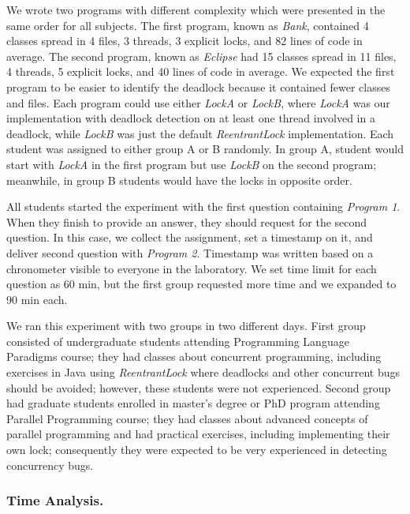 We wrote two programs with different complexity which were presented in the same order for all subjects. The first program, known as \emph{Bank}, contained 4 classes spread in 4 files, 3 threads, 3 explicit locks, and 82 lines of code in average. The second program, known as \emph{Eclipse} had 15 classes spread in 11 files, 4 threads, 5 explicit locks, and 40 lines of code in average. We expected the first program to be easier to identify the deadlock because it contained fewer classes and files. Each program could use either \emph{LockA} or \emph{LockB}, where \emph{LockA} was our implementation with deadlock detection on at least one thread involved in a deadlock, while \emph{LockB} was just the default \emph{ReentrantLock} implementation. Each student was assigned to either group A or B randomly. In group A, student would start with \emph{LockA} in the first program but use \emph{LockB} on the second program; meanwhile, in group B students would have the locks in opposite order.

All students started the experiment with the first question containing \emph{Program 1}. When they finish to provide an answer, they should request for the second question. In this case, we collect the assignment, set a timestamp on it, and deliver second question with \emph{Program 2}. Timestamp was written based on a chronometer visible to everyone in the laboratory.
We set time limit for each question as 60 min, but the first group requested more time and we expanded to 90 min each. 

We ran this experiment with two groups in two different days. First group consisted of undergraduate students attending Programming Language Paradigms course; they had classes about concurrent programming, including exercises in Java using \emph{ReentrantLock} where deadlocks and other concurrent bugs should be avoided; however, these students were not experienced. Second group had graduate students enrolled in master's degree or PhD program attending Parallel Programming course; they had classes about advanced concepts of parallel programming and had practical exercises, including implementing their own lock; consequently they were expected to be very experienced in detecting concurrency bugs.

\subsubsection{Time Analysis.}

